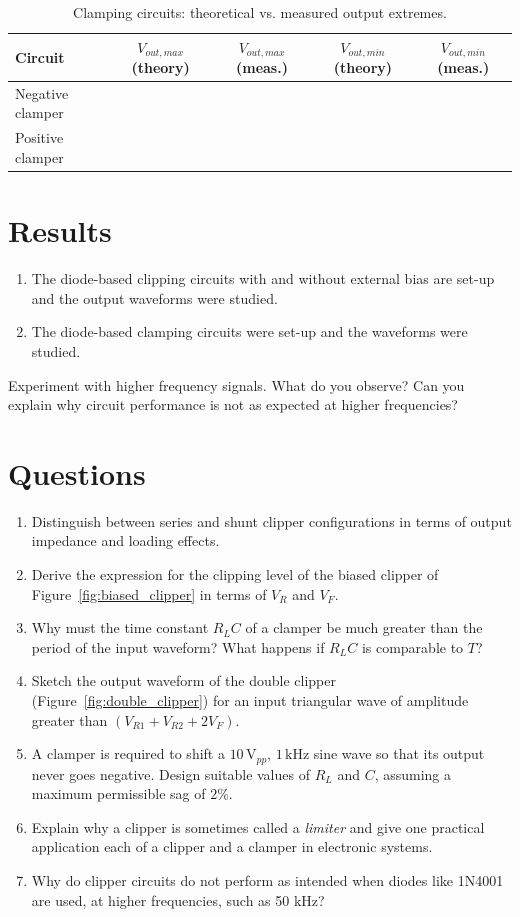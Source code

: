 \begin{table}[ht!]
	\centering
	\begin{tabular}{@{}lcccc@{}}
		\toprule
		Circuit & $V_{out,max}$ (theory) & $V_{out,max}$ (meas.) & $V_{out,min}$ (theory) & $V_{out,min}$ (meas.) \\
		\midrule
		Negative clamper &  &  &  &  \\
		Positive clamper &  &  &  &  \\
		\bottomrule
	\end{tabular}
	\caption{Clamping circuits: theoretical vs. measured output extremes.}
	\label{tab:ObsClampers}
\end{table}
\section{Results}
\begin{enumerate}
	\item The diode-based clipping circuits with and without external bias are set-up and the output waveforms were studied. 
	\item The diode-based clamping circuits were set-up and the waveforms were studied.
\end{enumerate}


\begin{explorebox}
	Experiment with higher frequency signals. What do you observe? Can you explain why circuit performance is not as expected at higher frequencies?
\end{explorebox}
\section{Questions}
\begin{enumerate}[label=Q\arabic*.]
	\item Distinguish between series and shunt clipper configurations in terms of output impedance and loading effects.
	\item Derive the expression for the clipping level of the biased clipper of Figure~\ref{fig:biased_clipper} in terms of $V_R$ and $V_F$.
	\item Why must the time constant $R_L C$ of a clamper be much greater than the period of the input waveform? What happens if $R_L C$ is comparable to $T$?
	\item Sketch the output waveform of the double clipper (Figure~\ref{fig:double_clipper}) for an input triangular wave of amplitude greater than $(V_{R1}+V_{R2}+2V_F)$.
	\item A clamper is required to shift a $10\,\text{V}_{pp}$, $1\,\text{kHz}$ sine wave so that its output never goes negative. Design suitable values of $R_L$ and $C$, assuming a maximum permissible sag of $2\%$.
	\item Explain why a clipper is sometimes called a \emph{limiter} and give one practical application each of a clipper and a clamper in electronic systems.
	\item Why do clipper circuits do not perform as intended when diodes like 1N4001 are used, at higher frequencies, such as 50 kHz?
\end{enumerate}